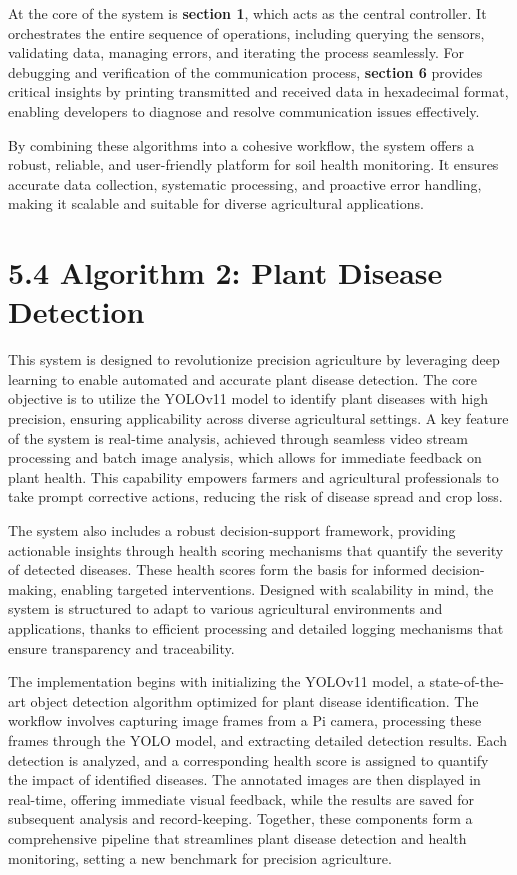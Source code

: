 \documentclass{book} %
\begin{document}
\noindent At the core of the system is \textbf{section 1}, which acts as the central controller. It orchestrates the entire sequence of operations, including querying the sensors, validating data, managing errors, and iterating the process seamlessly. For debugging and verification of the communication process, \textbf{section 6} provides critical insights by printing transmitted and received data in hexadecimal format, enabling developers to diagnose and resolve communication issues effectively.

\noindent By combining these algorithms into a cohesive workflow, the system offers a robust, reliable, and user-friendly platform for soil health monitoring. It ensures accurate data collection, systematic processing, and proactive error handling, making it scalable and suitable for diverse agricultural applications.

\noindent 

\noindent 
\section{5.4 Algorithm 2: Plant Disease Detection}

\noindent This system is designed to revolutionize precision agriculture by leveraging deep learning to enable automated and accurate plant disease detection. The core objective is to utilize the YOLOv11 model to identify plant diseases with high precision, ensuring applicability across diverse agricultural settings. A key feature of the system is real-time analysis, achieved through seamless video stream processing and batch image analysis, which allows for immediate feedback on plant health. This capability empowers farmers and agricultural professionals to take prompt corrective actions, reducing the risk of disease spread and crop loss.

\noindent The system also includes a robust decision-support framework, providing actionable insights through health scoring mechanisms that quantify the severity of detected diseases. These health scores form the basis for informed decision-making, enabling targeted interventions. Designed with scalability in mind, the system is structured to adapt to various agricultural environments and applications, thanks to efficient processing and detailed logging mechanisms that ensure transparency and traceability.

\noindent The implementation begins with initializing the YOLOv11 model, a state-of-the-art object detection algorithm optimized for plant disease identification. The workflow involves capturing image frames from a Pi camera, processing these frames through the YOLO model, and extracting detailed detection results. Each detection is analyzed, and a corresponding health score is assigned to quantify the impact of identified diseases. The annotated images are then displayed in real-time, offering immediate visual feedback, while the results are saved for subsequent analysis and record-keeping. Together, these components form a comprehensive pipeline that streamlines plant disease detection and health monitoring, setting a new benchmark for precision agriculture.
\end{document}
